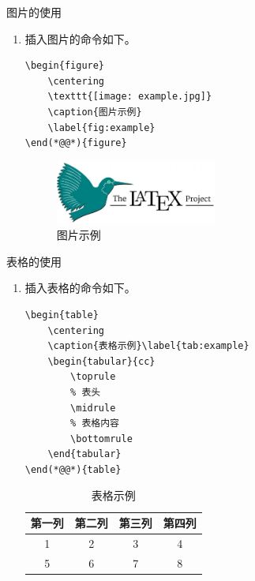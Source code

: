 \documentclass[8pt]{ctexbeamer}
\begin{document}
\begin{frame}[fragile]{\insertsection}{\insertsubsection}

    \begin{block}{图片的使用}
        \begin{enumerate}
            \item 插入图片的命令如下。
            \begin{lstlisting}[style=latex]
\begin{figure}
    \centering
    \texttt{[image: example.jpg]}
    \caption{图片示例}
    \label{fig:example}
\end(*@@*){figure}
            \end{lstlisting}
            \begin{figure}
                \centering
                \includegraphics[width=0.5\textwidth]{figs/example.jpg}
                \caption{图片示例}
                \label{fig:example}
            \end{figure}
        \end{enumerate}
    \end{block}

\end{frame}

\begin{frame}[fragile]{\insertsection}{\insertsubsection}

    \begin{block}{表格的使用}
        \begin{enumerate}
            \item 插入表格的命令如下。
        \begin{lstlisting}[style=latex]
\begin{table}
    \centering
    \caption{表格示例}\label{tab:example}
    \begin{tabular}{cc}
        \toprule
        % 表头
        \midrule
        % 表格内容
        \bottomrule
    \end{tabular}
\end(*@@*){table}
        \end{lstlisting}

        \begin{table}
            \centering
            \caption{表格示例}\label{tab:example}
            \begin{tabular}{cccc}
                \toprule
                第一列 & 第二列 & 第三列 & 第四列 \\
                \midrule
                1 & 2 & 3 & 4 \\
                5 & 6 & 7 & 8 \\
                \bottomrule
            \end{tabular}
        \end{table}
        \end{enumerate}
    \end{block}
\end{frame}
\end{document}
